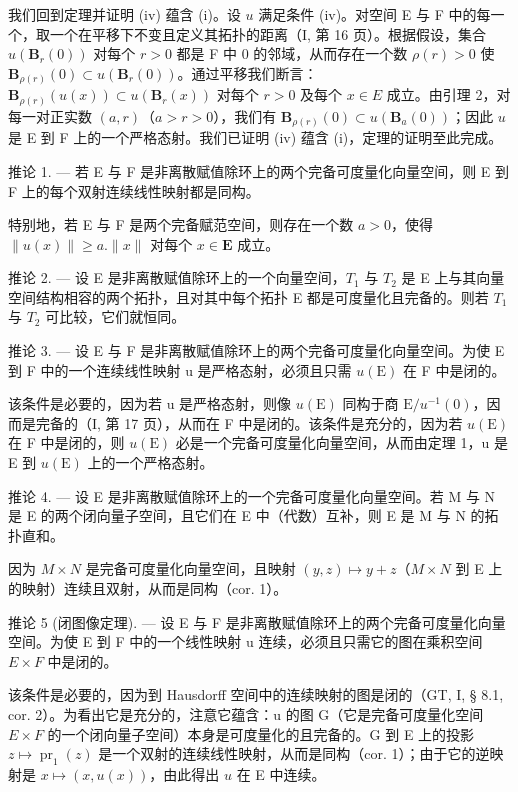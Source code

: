 我们回到定理并证明 (iv) 蕴含 (i)。设 \(u\) 满足条件 (iv)。对空间 E 与 F 中的每一个，取一个在平移下不变且定义其拓扑的距离（I, 第 16 页）。根据假设，集合 \(u(\mathbf{B}_r(0))\) 对每个 \(r > 0\) 都是 F 中 0 的邻域，从而存在一个数 \(\rho(r) > 0\) 使 \(\mathbf{B}_{\rho(r)}(0) \subset u(\mathbf{B}_r(0))\)。通过平移我们断言：\(\mathbf{B}_{\rho(r)}(u(x)) \subset u(\mathbf{B}_r(x))\) 对每个 \(r > 0\) 及每个 \(x \in E\) 成立。由引理 2，对每一对正实数 \((a, r)\)（\(a > r > 0\)），我们有 \(\mathbf{B}_{\rho(r)}(0) \subset u(\mathbf{B}_a(0))\)；因此 \(u\) 是 E 到 F 上的一个严格态射。我们已证明 (iv) 蕴含 (i)，定理的证明至此完成。

推论 1. --- 若 E 与 F 是非离散赋值除环上的两个完备可度量化向量空间，则 E 到 F 上的每个双射连续线性映射都是同构。

特别地，若 E 与 F 是两个完备赋范空间，则存在一个数 \(a > 0\)，使得 \(\| u(x)\| \geqslant a.\| x\|\) 对每个 \(x\in \mathbf{E}\) 成立。

推论 2. --- 设 E 是非离散赋值除环上的一个向量空间，\(T_{1}\) 与 \(T_{2}\) 是 E 上与其向量空间结构相容的两个拓扑，且对其中每个拓扑 E 都是可度量化且完备的。则若 \(T_{1}\) 与 \(T_{2}\) 可比较，它们就恒同。

推论 3. --- 设 E 与 F 是非离散赋值除环上的两个完备可度量化向量空间。为使 E 到 F 中的一个连续线性映射 u 是严格态射，必须且只需 \(u(\mathrm{E})\) 在 F 中是闭的。

该条件是必要的，因为若 u 是严格态射，则像 \(u(\mathrm{E})\) 同构于商 \(\mathrm{E}/u^{-1}(0)\)，因而是完备的（I, 第 17 页），从而在 F 中是闭的。该条件是充分的，因为若 \(u(\mathrm{E})\) 在 F 中是闭的，则 \(u(\mathrm{E})\) 必是一个完备可度量化向量空间，从而由定理 1，u 是 E 到 \(u(\mathrm{E})\) 上的一个严格态射。

推论 4. --- 设 E 是非离散赋值除环上的一个完备可度量化向量空间。若 M 与 N 是 E 的两个闭向量子空间，且它们在 E 中（代数）互补，则 E 是 M 与 N 的拓扑直和。

因为 \(M \times N\) 是完备可度量化向量空间，且映射 \((y, z) \mapsto y + z\)（\(M \times N\) 到 E 上的映射）连续且双射，从而是同构（cor. 1）。

推论 5 (闭图像定理). --- 设 E 与 F 是非离散赋值除环上的两个完备可度量化向量空间。为使 E 到 F 中的一个线性映射 u 连续，必须且只需它的图在乘积空间 \(E \times F\) 中是闭的。

该条件是必要的，因为到 Hausdorff 空间中的连续映射的图是闭的（GT, I, § 8.1, cor. 2）。为看出它是充分的，注意它蕴含：u 的图 G（它是完备可度量化空间 \(E \times F\) 的一个闭向量子空间）本身是可度量化的且完备的。G 到 E 上的投影 \(z \mapsto \operatorname{pr}_{1}(z)\) 是一个双射的连续线性映射，从而是同构（cor. 1）；由于它的逆映射是 \(x \mapsto (x, u(x))\)，由此得出 \(u\) 在 E 中连续。

